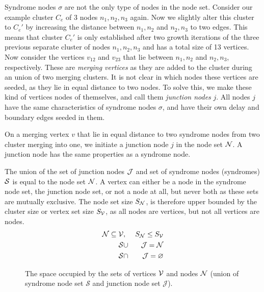 Syndrome nodes $\sigma$ are not the only type of nodes in the node set. Consider our example cluster $C_e$ of 3 nodes $n_1, n_2, n_3$ again. Now we slightly alter this cluster to $C_e'$ by increasing the distance between $n_1, n_2$ and $n_2, n_3$ to two edges. This means that cluster $C_e'$ is only established after two growth iterations of the three previous separate cluster of nodes $n_1, n_2, n_3$ and has a total size of 13 vertices. Now consider the vertices $v_{12}$ and $v_{23}$ that lie between $n_1, n_2$ and $n_2, n_3$, respectively. These are \emph{merging vertices} as they are added to the cluster during an union of two merging clusters. It is not clear in which nodes these vertices are seeded, as they lie in equal distance to two nodes. To solve this, we make these kind of vertices nodes of themselves, and call them \emph{junction nodes} $j$. All nodes $j$ have the same characteristics of syndrome nodes $\sigma$, and have their own delay and boundary edges seeded in them.

\begin{lemma}\label{lem:junctionode}
  On a merging vertex $v$ that lie in equal distance to two syndrome nodes from two cluster merging into one, we initiate a junction node $j$ in the node set $\mathcal{N}$. A junction node has the same properties as a syndrome node.
\end{lemma}

The union of the set of junction nodes $\mathcal{J}$ and set of syndrome nodes (syndromes) $\mathcal{S}$ is equal to the node set $\mathcal{N}$. A vertex can either be a node in the syndrome node set, the junction node set, or not a node at all, but never both as these sets are mutually exclusive. The node set size $S_{\mathcal{N}}$, is therefore upper bounded by the cluster size or vertex set size $S_{\mathcal{V}}$, as all nodes are vertices, but not all vertices are nodes.
\begin{eqnarray}
  \mathcal{N} \subseteq \mathcal{V} &,& S_{\mathcal{N}} \leq S_{\mathcal{V}}  \\
  \nonumber \mathcal{S} &\cup& \mathcal{J} = \mathcal{N} \\
  \nonumber \mathcal{S} &\cap& \mathcal{J} = \varnothing
\end{eqnarray}

\begin{figure}
  \centering
  \caption{The space occupied by the sets of vertices $\mathcal{V}$ and nodes $\mathcal{N}$ (union of syndrome node set $\mathcal{S}$ and junction node set $\mathcal{J}$).}\label{fig:sets}
\end{figure}

